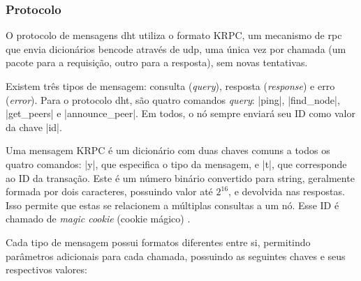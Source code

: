 
\subsubsection*{Protocolo}

O protocolo de mensagens \gls*{dht} utiliza o formato KRPC, um mecanismo de \gls{rpc}
que envia dicionários \gls*{bencode} através de \gls*{udp}, uma única vez por chamada
(um pacote para a requisição, outro para a resposta), sem novas tentativas.

Existem três tipos de mensagem: consulta (\emph{query}), resposta (\emph{response}) e
erro (\emph{error}). Para o protocolo \gls*{dht}, são quatro comandos \emph{query}:
\bverb|ping|, \bverb|find_node|, \bverb|get_peers| e \bverb|announce_peer|. Em todos, o
nó sempre enviará seu ID como valor da chave \bverb|id|.

Uma mensagem KRPC é um dicionário com duas chaves comuns a todos os quatro comandos:
\bverb|y|, que especifica o tipo da mensagem, e \bverb|t|, que corresponde ao ID da
transação. Este é um número binário convertido para \gls*{string}, geralmente formada
por dois caracteres, possuindo valor até $2^{16}$, e devolvida nas respostas. Isso
permite que estas se relacionem a múltiplas consultas a um nó. Esse ID é chamado de
\emph{magic cookie} (cookie mágico) \cite{wiki:magic-cookie}.

Cada tipo de mensagem possui formatos diferentes entre si, permitindo parâmetros
adicionais para cada chamada, possuindo as seguintes chaves e seus respectivos valores:

